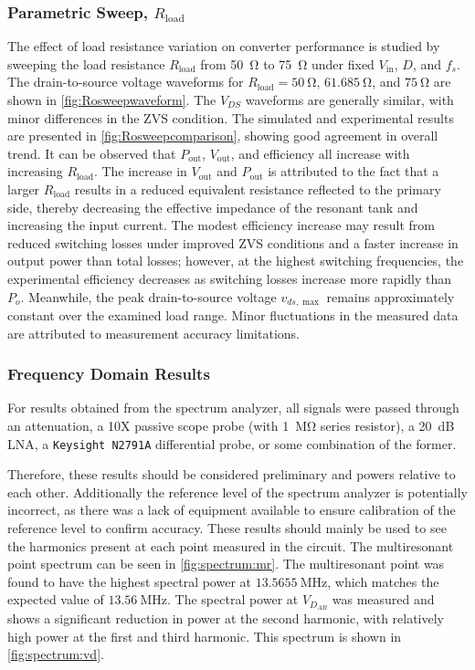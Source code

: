\documentclass[journal, 9pt, letterpaper, english]{IEEEtran}[2015/08/26]
\begin{document}
\subsubsection{Parametric Sweep, $R_\mathrm{load}$}
The effect of load resistance variation on converter performance is studied by sweeping the load resistance $R_\mathrm{load}$ from \qty{50}{\ohm} to \qty{75}{\ohm} under fixed $V_{\mathrm{in}}$, $D$, and $f_s$.
The drain-to-source voltage waveforms for $R_\mathrm{load} = \qty{50}{\ohm}$, $\qty{61.685}{\ohm}$, and $\qty{75}{\ohm}$ are shown in \cref{fig:Rosweepwaveform}.
The $V_{DS}$ waveforms are generally similar, with minor differences in the ZVS condition.
The simulated and experimental results are presented in \cref{fig:Rosweepcomparison}, showing good agreement in overall trend.
It can be observed that $P_{\mathrm{out}}$, $V_{\mathrm{out}}$, and efficiency all increase with increasing $R_\mathrm{load}$.
The increase in $V_{\mathrm{out}}$ and $P_{\mathrm{out}}$ is attributed to the fact that a larger $R_\mathrm{load}$ results in a reduced equivalent resistance reflected to the primary side, thereby decreasing the effective impedance of the resonant tank and increasing the input current.
The modest efficiency increase may result from reduced switching losses under improved ZVS conditions and a faster increase in output power than total losses; however, at the highest switching frequencies, the experimental efficiency decreases as switching losses increase more rapidly than $P_o$.
Meanwhile, the peak drain-to-source voltage $v_{ds,\max}$ remains approximately constant over the examined load range.
Minor fluctuations in the measured data are attributed to measurement accuracy limitations.

\subsubsection{Frequency Domain Results}
For results obtained from the spectrum analyzer, all signals were passed through an attenuation, a 10X passive scope probe (with \qty{1}{\mega\ohm} series resistor), a \qty{20}{\dB} LNA, a \verb|Keysight N2791A| differential probe, or some combination of the former.

Therefore, these results should be considered preliminary and powers relative to each other.
Additionally the reference level of the spectrum analyzer is potentially incorrect, as there was a lack of equipment available to ensure calibration of the reference level to confirm accuracy.
These results should mainly be used to see the harmonics present at each point measured in the circuit. The multiresonant point spectrum can be seen in \cref{fig:spectrum:mr}.
The multiresonant point was found to have the highest spectral power at $\qty{13.5655}{\mega\hertz}$, which matches the expected value of $\qty{13.56}{\mega\hertz}$.
The spectral power at $V_{D_{AB}}$ was measured and shows a significant reduction in power at the second harmonic, with relatively high power at the first and third harmonic.
This spectrum is shown in \cref{fig:spectrum:vd}.
\end{document}
